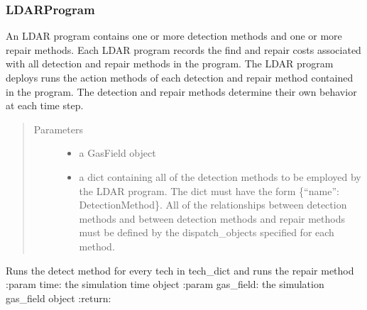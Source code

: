 \documentclass[letterpaper,10pt,english]{sphinxmanual}
\begin{document}
\subsubsection{LDARProgram}
\label{\detokenize{index:ldarprogram}}

\begin{fulllineitems}
\label{\detokenize{index:feast.DetectionModules.ldar_program.LDARProgram}}
An LDAR program contains one or more detection methods and one or more repair methods. Each LDAR program records
the find and repair costs associated with all detection and repair methods in the program. The LDAR program
deploys runs the action methods of each detection and repair method contained in the program. The detection and
repair methods determine their own behavior at each time step.
\begin{quote}\begin{description}
\item[{Parameters}] \leavevmode\begin{itemize}
\item {} 
 \textendash{} a GasField object

\item {} 
 \textendash{} a dict containing all of the detection methods to be employed by the LDAR program. The dict
must have the form \{“name”: DetectionMethod\}. All of the relationships between detection methods and between
detection methods and repair methods must be defined by the dispatch\_objects specified for each method.

\end{itemize}

\end{description}\end{quote}

\begin{fulllineitems}
\label{\detokenize{index:feast.DetectionModules.ldar_program.LDARProgram.action}}
Runs the detect method for every tech in tech\_dict and runs the repair method
:param time: the simulation time object
:param gas\_field: the simulation gas\_field object
:return:


\end{fulllineitems}
\end{fulllineitems}
\end{document}
